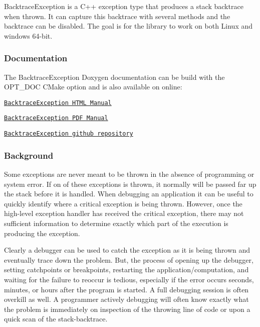 Backtrace\-Exception is a C++ exception type that produces a stack backtrace when thrown. It can capture this backtrace with several methods and the backtrace can be disabled. The goal is for the library to work on both Linux and windows 64-\/bit.

\subsubsection*{Documentation}

The Backtrace\-Exception Doxygen documentation can be build with the {\ttfamily O\-P\-T\-\_\-\-D\-O\-C} C\-Make option and is also available on online\-:
\begin{DoxyItemize}
\item \href{https://markjolah.github.io/BacktraceException/index.html}{\tt Backtrace\-Exception H\-T\-M\-L Manual}
\item \href{https://markjolah.github.io/BacktraceException/pdf/BacktraceException-0.2-reference.pdf}{\tt Backtrace\-Exception P\-D\-F Manual}
\item \href{https://github.com/markjolah/BacktraceException}{\tt Backtrace\-Exception github repository}
\end{DoxyItemize}

\subsubsection*{Background}

Some exceptions are never meant to be thrown in the absence of programming or system error. If on of these exceptions is thrown, it normally will be passed far up the stack before it is handled. When debugging an application it can be useful to quickly identify where a critical exception is being thrown. However, once the high-\/level exception handler has received the critical exception, there may not sufficient information to determine exactly which part of the execution is producing the exception.

Clearly a debugger can be used to catch the exception as it is being thrown and eventually trace down the problem. But, the process of opening up the debugger, setting catchpoints or breakpoints, restarting the application/computation, and waiting for the failure to reoccur is tedious, especially if the error occurs seconds, minutes, or hours after the program is started. A full debugging session is often overkill as well. A programmer actively debugging will often know exactly what the problem is immediately on inspection of the throwing line of code or upon a quick scan of the stack-\/backtrace.

